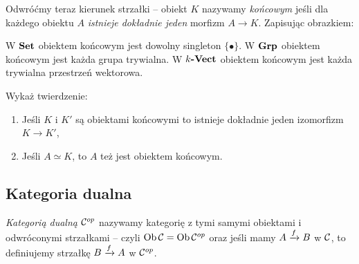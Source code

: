 \begin{defn}
	Odwróćmy teraz kierunek strzałki -- obiekt $K$ nazywamy \emph{końcowym} jeśli dla każdego obiektu $A$ \emph{istnieje dokładnie jeden} morfizm $A\to K$. Zapisując obrazkiem:
  \begin{center}\end{center}
\end{defn}

\begin{exmp}
  W $\Set$ obiektem końcowym jest dowolny singleton $\{\bullet\}$. W $\Grp$ obiektem końcowym jest każda grupa trywialna. W $\Vect k$ obiektem końcowym jest każda trywialna przestrzeń wektorowa.
\end{exmp}

\begin{exc}
  Wykaż twierdzenie:
  \begin{enumerate}
    \item Jeśli $K$ i $K'$ są obiektami końcowymi to istnieje dokładnie jeden izomorfizm $K\to K'$,
    \item Jeśli $A\simeq K$, to $A$ też jest obiektem końcowym.
  \end{enumerate}
\end{exc}

%
%
%

\subsection{Kategoria dualna}
\begin{defn}
  \emph{Kategorią dualną} $\op \C$ nazywamy kategorię z tymi samymi obiektami i odwróconymi strzałkami -- czyli $\Ob \C = \Ob {\op \C}$ oraz jeśli mamy $\morpharr fAB$ w $\C$, to definiujemy strzałkę $\morpharr fBA$ w $\op \C$.
\end{defn}

